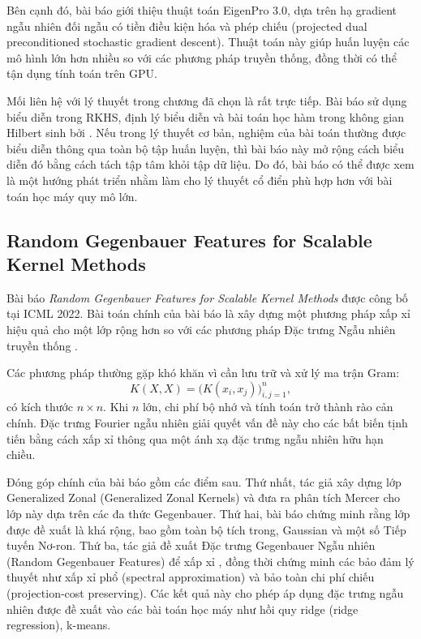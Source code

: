 Bên cạnh đó, bài báo giới thiệu thuật toán EigenPro 3.0, dựa trên hạ gradient
ngẫu nhiên đối ngẫu có tiền điều kiện hóa và phép chiếu (projected dual
preconditioned stochastic gradient descent). Thuật toán này giúp huấn luyện
các mô hình  lớn hơn nhiều so với các phương pháp 
truyền thống, đồng thời có thể tận dụng tính toán trên GPU.

Mối liên hệ với lý thuyết  trong chương đã chọn là rất trực tiếp.
Bài báo sử dụng biểu diễn  trong RKHS, định lý biểu diễn và bài
toán học hàm trong không gian Hilbert sinh bởi . Nếu trong lý
thuyết cơ bản, nghiệm của bài toán  thường được biểu diễn thông qua
toàn bộ tập huấn luyện, thì bài báo này mở rộng cách biểu diễn đó bằng cách
tách tập tâm  khỏi tập dữ liệu. Do đó, bài báo có thể được xem là
một hướng phát triển nhằm làm cho lý thuyết  cổ điển phù hợp hơn
với bài toán học máy quy mô lớn.

\subsection{Random Gegenbauer Features for Scalable Kernel Methods}

Bài báo \emph{Random Gegenbauer Features for Scalable Kernel Methods} được
công bố tại ICML 2022. Bài toán chính của bài báo là xây dựng một phương pháp
xấp xỉ  hiệu quả cho một lớp  rộng hơn so với các phương
pháp Đặc trưng Ngẫu nhiên truyền thống \cite{han2022randomgegenbauerfeaturesscalable}.

Các phương pháp  thường gặp khó khăn vì cần lưu trữ và xử lý ma
trận Gram:
\begin{equation}
  K(X,X) = \bigl(K(x_i,x_j)\bigr)_{i,j=1}^{n},
\end{equation}
có kích thước $n \times n$. Khi $n$ lớn, chi phí bộ nhớ và tính toán trở thành
rào cản chính. Đặc trưng Fourier ngẫu nhiên giải quyết vấn đề này cho các
 bất biến tịnh tiến bằng cách xấp xỉ  thông qua một ánh
xạ đặc trưng ngẫu nhiên hữu hạn chiều.

Đóng góp chính của bài báo gồm các điểm sau. Thứ nhất, tác giả xây dựng lớp
 Generalized Zonal (Generalized Zonal Kernels) và đưa ra phân tích
Mercer cho lớp  này dựa trên các đa thức Gegenbauer. Thứ hai, bài
báo chứng minh rằng lớp  được đề xuất là khá rộng, bao gồm toàn bộ
 tích trong,  Gaussian và một số  Tiếp tuyến
Nơ-ron. Thứ ba, tác giả đề xuất Đặc trưng Gegenbauer Ngẫu nhiên
(Random Gegenbauer Features) để xấp xỉ , đồng thời chứng minh các
bảo đảm lý thuyết như xấp xỉ phổ (spectral approximation) và bảo toàn chi phí
chiếu (projection-cost preserving). Các kết quả này cho phép áp dụng đặc trưng
ngẫu nhiên được đề xuất vào các bài toán học máy như  hồi quy ridge
(ridge regression),  k-means.

